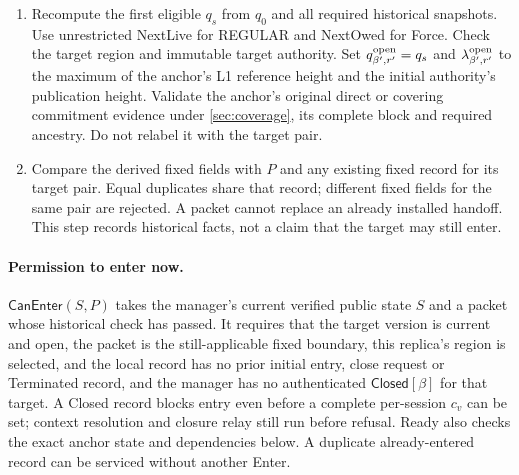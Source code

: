 \documentclass[11pt,a4paper]{article}
\newcommand{\tagg}[1]{\ensuremath{\mathsf{#1}}}
\begin{document}
\begin{enumerate}[label=(\roman*),itemsep=2pt]
new versions, retained prefix and boundary from that unique replay
transition. Require $\beta'=\beta_{\rm entry}+1$, the target slot
derived in \cref{sec:retry-slot}, and anchor equality with pre-payload
$G$, including prefix provenance. Verify zero or positive accepted count
rather than inferring it from the anchor's producer.
During an unassigned interval, verify the stored context and any
intervening Forces rather than inventing an empty export session.
A later Force supersedes this boundary for future activation, but does
not invalidate its historical cause, original selection or retained anchor.
\item Recompute the first eligible $q_s$ from $q_0$ and all required
historical snapshots. Use unrestricted NextLive for REGULAR and
NextOwed for Force. Check the target region and immutable target authority.
Set $q^{\rm open}_{\beta',r'}=q_s$ and
$\lambda^{\rm open}_{\beta',r'}$ to the maximum of the anchor's L1
reference height and the initial authority's publication height.
Validate the anchor's original direct or covering commitment evidence
under \cref{sec:coverage}, its complete block and required ancestry.
Do not relabel it with the target pair.
\item Compare the derived fixed fields with $P$ and any existing
fixed record for its target pair. Equal duplicates share that record;
different fixed fields for the same pair are rejected. A packet cannot
replace an already installed handoff. This step records historical facts,
not a claim that the target may still enter.
\end{enumerate}

\paragraph{Permission to enter now.}
\label{sec:can-enter}
$\tagg{CanEnter}(S,P)$ takes the manager's current verified public state
$S$ and a packet whose historical check has passed. It requires that the
target version is current and open, the packet is the still-applicable
fixed boundary, this replica's region is selected, and the local record
has no prior initial entry, close request or Terminated record, and the
manager has no authenticated $\tagg{Closed}[\beta]$ for that target.
A Closed record blocks entry even before a complete per-session $c_v$
can be set; context resolution and closure relay still run before refusal. Ready
also checks the exact anchor state and dependencies below. A duplicate
already-entered record can be serviced without another Enter.
\end{document}
